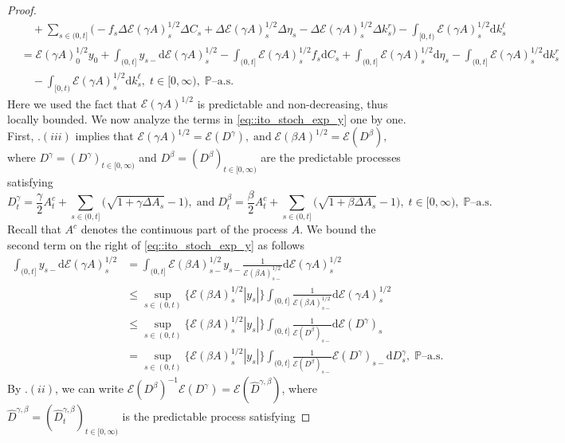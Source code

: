 \documentclass[10pt]{article} %
\newcommand\cE{\mathcal E}
\def \P{\mathbb{P}}
\newcommand{\1}{\mathbf{1}}
\def\d{\mathrm{d}}
\begin{document}
\begin{proof}
\begin{align}
		&\quad +\sum_{s \in (0,t]} \Big(-f_s\Delta \cE(\gamma A)^{1/2}_s \Delta C_s + \Delta \cE(\gamma A)^{1/2}_s \Delta \eta_s - \Delta \cE(\gamma A)^{1/2}_s \Delta k^r_s\Big) \nonumber - \int_{[0,t)} \cE(\gamma A)^{1/2}_s \d k^\ell_s \nonumber\\
		&= \cE(\gamma A)^{1/2}_0 y_0 + \int_{(0,t]}y_{s-}\d\cE(\gamma A)^{1/2}_s - \int_{(0,t]} \cE(\gamma A)^{1/2}_s f_s \d C_s + \int_{(0,t]} \cE(\gamma A)^{1/2}_s\d \eta_s - \int_{(0,t]} \cE(\gamma A)^{1/2}_s\d k^r_s \nonumber\\
		&\quad - \int_{[0,t)} \cE(\gamma A)^{1/2}_s \d k^\ell_s, \; t \in [0,\infty), \; \text{$\P$--a.s.} 
	\end{align}
	Here we used the fact that $\cE(\gamma A)^{1/2}$ is predictable and non-decreasing, thus locally bounded. We now analyze the terms in \eqref{eq::ito_stoch_exp_y} one by one. First, .$(iii)$ implies that $\cE(\gamma A)^{1/2} = \cE(D^\gamma), \; \text{and} \; \cE(\beta A)^{1/2} = \cE(D^\beta),$ where $D^\gamma = (D^\gamma)_{t \in [0,\infty)}$ and $D^\beta = (D^\beta)_{t \in [0,\infty)}$ are the predictable processes satisfying
	\begin{equation*}
		D^\gamma_t = \frac{\gamma}{2} A^c_t + \sum_{s \in (0,t]} \big(\sqrt{1+\gamma\Delta A_s}-1\big), \; \text{and} \; D^\beta_t = \frac{\beta}{2} A^c_t + \sum_{s \in (0,t]} \big(\sqrt{1+\beta\Delta A_s}-1\big), \; t \in [0,\infty), \; \text{$\P$--a.s.}
	\end{equation*}
	Recall that $A^c$ denotes the continuous part of the process $A$. We bound the second term on the right of \eqref{eq::ito_stoch_exp_y} as follows
	\begin{align}\label{eq::sup_stoch_exp_inverse}
		\int_{(0,t]}y_{s-}\d\cE(\gamma A)^{1/2}_s 
		&= \int_{(0,t]}\cE(\beta A)^{1/2}_{s-}y_{s-}\frac{1}{\cE(\beta A)^{1/2}_{s-}}\d\cE(\gamma A)^{1/2}_s \nonumber\\
		&\leq \sup_{s \in (0,t)}\big\{\cE(\beta A)^{1/2}_{s}|y_{s}|\big\}\int_{(0,t]}\frac{1}{\cE(\beta A)^{1/2}_{s-}}\d\cE(\gamma A)^{1/2}_s \nonumber\\
		&\leq \sup_{s \in (0,t)}\big\{\cE(\beta A)^{1/2}_{s}|y_{s}|\big\}\int_{(0,t]}\frac{1}{\cE(D^\beta)_{s-}}\d\cE(D^\gamma)_s \nonumber\\
		&= \sup_{s \in (0,t)}\big\{\cE(\beta A)^{1/2}_{s}|y_{s}|\big\}\int_{(0,t]}\frac{1}{\cE(D^\beta)_{s-}}\cE(D^\gamma)_{s-}\d D^\gamma_s, \; \text{$\P$--a.s.}
	\end{align}
	By .$(ii)$, we can write $\cE(D^\beta)^{-1}\cE(D^\gamma) = \cE(\widehat D^{\gamma,\beta})$, where $\widehat D^{\gamma,\beta} = (\widehat D^{\gamma,\beta}_t)_{t \in [0,\infty)}$ is the predictable process satisfying

\end{proof}
\end{document}
